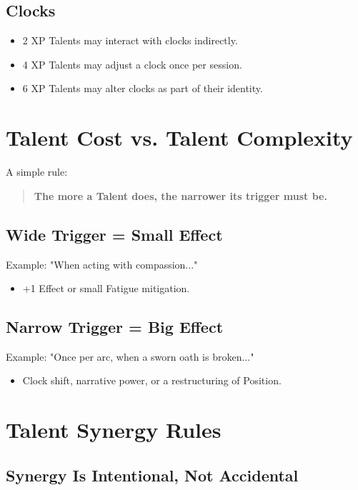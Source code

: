 \documentclass[11pt]{book}
\begin{document}
\subsection{Clocks}

\begin{itemize}
    \item 2 XP Talents may interact with clocks indirectly.
    \item 4 XP Talents may adjust a clock once per session.
    \item 6 XP Talents may alter clocks as part of their identity.
\end{itemize}

\section{Talent Cost vs. Talent Complexity}

A simple rule:

\begin{quote}
\textbf{The more a Talent does, the narrower its trigger must be.}
\end{quote}

\subsection{Wide Trigger = Small Effect}
Example: "When acting with compassion..."

\begin{itemize}
    \item +1 Effect or small Fatigue mitigation.
\end{itemize}

\subsection{Narrow Trigger = Big Effect}
Example: "Once per arc, when a sworn oath is broken..."

\begin{itemize}
    \item Clock shift, narrative power, or a restructuring of Position.
\end{itemize}

\section{Talent Synergy Rules}

\subsection{Synergy Is Intentional, Not Accidental}
\end{document}
